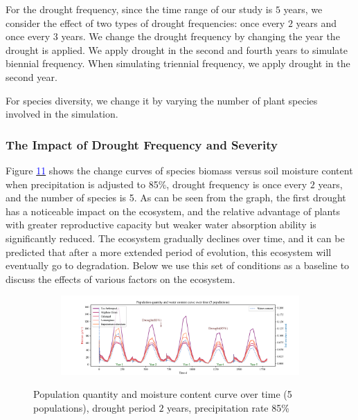 \documentclass{mcmthesis}
\begin{document}
For the drought frequency, since the time range of our study is $5$ years, we consider the effect of two types of drought frequencies: once every $2$ years and once every $3$ years. We change the drought frequency by changing the year the drought is applied. We apply drought in the second and fourth years to simulate biennial frequency. When simulating triennial frequency, we apply drought in the second year.

For species diversity, we change it by varying the number of plant species involved in the simulation.

\subsubsection{The Impact of Drought Frequency and Severity}

\indent

Figure \hyperref[fig:5_2_85]{\textcolor{blue}{11}} shows the change curves of species biomass versus soil moisture content when precipitation is adjusted to 85\%, drought frequency is once every $2$ years, and the number of species is 5. As can be seen from the graph, the first drought has a noticeable impact on the ecosystem, and the relative advantage of plants with greater reproductive capacity but weaker water absorption ability is significantly reduced. The ecosystem gradually declines over time, and it can be predicted that after a more extended period of evolution, this ecosystem will eventually go to degradation. Below we use this set of conditions as a baseline to discuss the effects of various factors on the ecosystem.

\begin{figure}[h]
\centering 
\begin{subfigure}{ 0.95\textwidth}
\includegraphics[width=\textwidth]{img/baseline_5_2_85.pdf}
\end{subfigure}
\caption{Population quantity and moisture content curve over time (5 populations), drought period $2$ years, precipitation rate 85\%}
\label{fig:5_2_85}
\end{figure}
\end{document}
